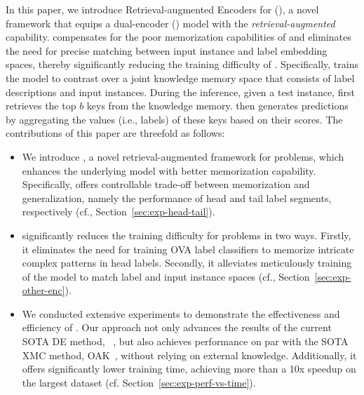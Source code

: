 In this paper, we introduce Retrieval-augmented Encoders for \XMC (\RAEXMC), a novel framework that equips a dual-encoder (\DE) model with the \textit{retrieval-augmented} capability.
\RAEXMC compensates for the poor memorization capabilities of \DE and eliminates the need for precise matching between input instance and label embedding spaces, thereby significantly reducing the training difficulty of \XMC.
Specifically, \RAEXMC trains the \DE model to contrast over a joint knowledge memory space that consists of label descriptions and input instances.
During the inference, given a test instance, \RAEXMC first retrieves the top $b$ keys from the knowledge memory.
\RAEXMC then generates predictions by aggregating the values (i.e., labels) of these keys based on their scores.
The contributions of this paper are threefold as follows:
\vspace{-.25em}
\begin{itemize}
    \item We introduce \RAEXMC, a novel retrieval-augmented framework for \XMC problems,
    which enhances the underlying \DE model with better memorization capability.
    Specifically, \RAEXMC offers controllable trade-off between memorization and generalization, namely the performance of head and tail label segments, respectively (cf., Section~\ref{sec:exp-head-tail}).
    \item \RAEXMC significantly reduces the training difficulty for \XMC problems in two ways. Firstly, it eliminates the need for training OVA label classifiers to memorize intricate complex patterns in head labels. Secondly, it alleviates meticulously training of the \DE model to match label and input instance spaces (cf., Section~\ref{sec:exp-other-enc}).
    \item We conducted extensive experiments to demonstrate the effectiveness and efficiency of \RAEXMC. Our approach not only advances the results of the current SOTA DE method, \DEXML~\citep{gupta2024dual}, but also achieves performance on par with the SOTA XMC method, OAK~\citep{mohan2024oak}, without relying on external knowledge. Additionally, it offers significantly lower training time, achieving more than a 10x speedup on the largest \LfAmznLarge dataset (cf. Section~\ref{sec:exp-perf-vs-time}).
\end{itemize}
